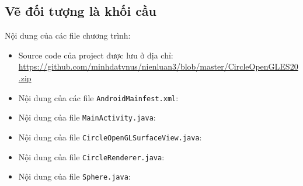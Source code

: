 \documentclass[13pt,a4paper]{extreport}
\begin{document}
\subsection{Vẽ đối tượng là khối cầu}
	Nội dung của các file chương trình:
		\begin{itemize}
			\item Source code của project được lưu ở địa chỉ: \url{https://github.com/minhdatvnus/nienluan3/blob/master/CircleOpenGLES20.zip}
			
			\item Nội dung của các file \verb|AndroidMainfest.xml|:
				
			
			\item Nội dung của file \verb|MainActivity.java|:
				
		
			\item Nội dung của file \verb|CircleOpenGLSurfaceView.java|:
				

			\item Nội dung của file \verb|CircleRenderer.java|:
				
									
			\item Nội dung của file \verb|Sphere.java|:
									
		\end{itemize}
		
\end{document}

